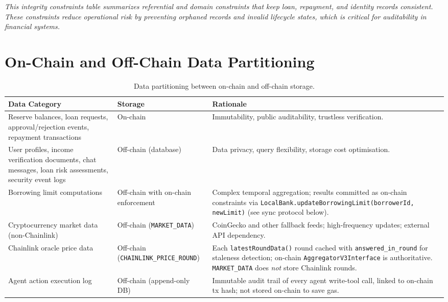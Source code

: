 \documentclass[12pt,a4paper]{report}
\newcommand{\tableheadcolor}{\rowcolor{TableHeadBg}}
\begin{document}
\vspace{2pt}
\noindent\textit{\small This integrity constraints table summarizes referential and domain constraints that keep loan, repayment, and identity records consistent. These constraints reduce operational risk by preventing orphaned records and invalid lifecycle states, which is critical for auditability in financial systems.}


\section{On-Chain and Off-Chain Data Partitioning}
\label{sec:data-partitioning}

\begin{table}[H]
\centering
\caption[Data partitioning between on-chain and off-chain storage]{Data partitioning between on-chain and off-chain storage.}
\label{tab:data-partitioning}
\begin{tabular}{p{4.5cm}p{2.5cm}p{6.5cm}}
\toprule
\tableheadcolor
\textbf{Data Category} & \textbf{Storage} & \textbf{Rationale} \\
\midrule
Reserve balances, loan requests, approval/rejection events, repayment transactions & On-chain & Immutability, public auditability, trustless verification. \\
User profiles, income verification documents, chat messages, loan risk assessments, security event logs & Off-chain (database) & Data privacy, query flexibility, storage cost optimisation. \\
Borrowing limit computations & Off-chain with on-chain enforcement & Complex temporal aggregation; results committed as on-chain constraints via \texttt{LocalBank.updateBorrowingLimit(borrowerId, newLimit)} (see sync protocol below). \\
Cryptocurrency market data (non-Chainlink) & Off-chain (\texttt{MARKET\_DATA}) & CoinGecko and other fallback feeds; high-frequency updates; external API dependency. \\
Chainlink oracle price data & Off-chain (\texttt{CHAINLINK\_PRICE\_ROUND}) & Each \texttt{latestRoundData()} round cached with \texttt{answered\_in\_round} for staleness detection; on-chain \texttt{AggregatorV3Interface} is authoritative. \texttt{MARKET\_DATA} does \textit{not} store Chainlink rounds. \\
Agent action execution log & Off-chain (append-only DB) & Immutable audit trail of every agent write-tool call, linked to on-chain tx hash; not stored on-chain to save gas. \\

\end{tabular}
\end{table}
\end{document}
